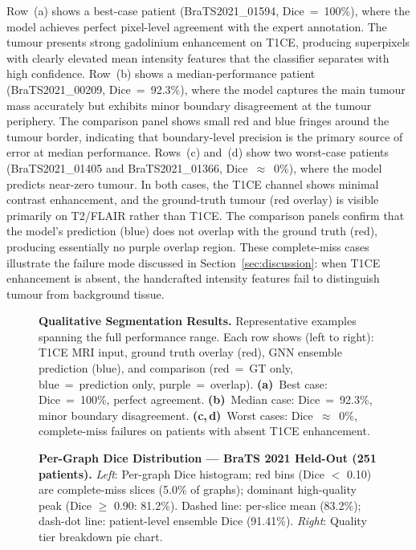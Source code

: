 \documentclass{article}
\begin{document}
Row~(a) shows a best-case patient (BraTS2021\_01594, Dice~=~100\%), where
the model achieves perfect pixel-level agreement with the expert annotation.
The tumour presents strong gadolinium enhancement on T1CE, producing
superpixels with clearly elevated mean intensity features that the classifier
separates with high confidence. Row~(b) shows a median-performance patient
(BraTS2021\_00209, Dice~=~92.3\%), where the model captures the main tumour
mass accurately but exhibits minor boundary disagreement at the tumour
periphery. The comparison panel shows small red and blue fringes around the
tumour border, indicating that boundary-level precision is the primary source
of error at median performance. Rows~(c) and~(d) show two worst-case
patients (BraTS2021\_01405 and BraTS2021\_01366, Dice~$\approx$~0\%), where
the model predicts near-zero tumour. In both cases, the T1CE channel shows
minimal contrast enhancement, and the ground-truth tumour (red overlay) is
visible primarily on T2/FLAIR rather than T1CE. The comparison panels confirm
that the model's prediction (blue) does not overlap with the ground truth
(red), producing essentially no purple overlap region. These complete-miss
cases illustrate the failure mode discussed in Section~\ref{sec:discussion}:
when T1CE enhancement is absent, the handcrafted intensity features fail to
distinguish tumour from background tissue.

\begin{figure}[htbp]
\caption{\textbf{Qualitative Segmentation Results.}
Representative examples spanning the full performance range. Each row shows
(left to right): T1CE MRI input, ground truth overlay (red), GNN ensemble
prediction (blue), and comparison (red~=~GT only, blue~=~prediction only,
purple~=~overlap). \textbf{(a)}~Best case: Dice~=~100\%, perfect agreement.
\textbf{(b)}~Median case: Dice~=~92.3\%, minor boundary disagreement.
\textbf{(c,\,d)}~Worst cases: Dice~$\approx$~0\%, complete-miss failures on
patients with absent T1CE enhancement.}
\label{fig:qualitative}
\end{figure}

\begin{figure}[htbp]
\caption{\textbf{Per-Graph Dice Distribution --- BraTS 2021 Held-Out (251 patients).}
\textit{Left}: Per-graph Dice histogram; red bins (Dice $<$ 0.10) are complete-miss
slices (5.0\% of graphs); dominant high-quality peak (Dice $\geq$ 0.90: 81.2\%).
Dashed line: per-slice mean (83.2\%); dash-dot line: patient-level ensemble Dice
(91.41\%). \textit{Right}: Quality tier breakdown pie chart.}
\label{fig:dice_hist}
\end{figure}
\end{document}
